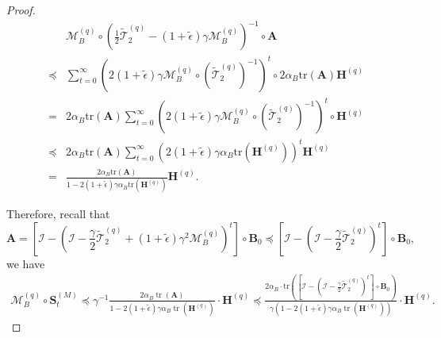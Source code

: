 \documentclass[11pt, letterpaper]{article}
\begin{document}
\begin{proof}
    \begin{equation*}
        \begin{aligned}
            &\mathcal{M}_B^{(q)}\circ \left(\frac{1}{2}\widetilde{\mathcal{T}}_2^{(q)}-(1+\widetilde{\epsilon})\gamma\mathcal{M}_B^{(q)}\right)^{-1}\circ\mathbf{A}\\
            \preceq&\sum_{t=0}^\infty \left(2(1+\widetilde{\epsilon})\gamma\mathcal{M}_B^{(q)}\circ(\widetilde{\mathcal{T}}_2^{(q)})^{-1}\right)^t\circ 2\alpha_B\mathrm{tr}(\mathbf{A})\mathbf{H}^{(q)}\\
            =&2\alpha_B\mathrm{tr}(\mathbf{A})\sum_{t=0}^\infty \left(2(1+\widetilde{\epsilon})\gamma\mathcal{M}_B^{(q)}\circ(\widetilde{\mathcal{T}}_2^{(q)})^{-1}\right)^{t}\circ \mathbf{H}^{(q)}\\
            \preceq&2\alpha_B\mathrm{tr}(\mathbf{A})\sum_{t=0}^\infty \left(2(1+\widetilde{\epsilon})\gamma\alpha_B\mathrm{tr}(\mathbf{H}^{(q)})\right)^{t} \mathbf{H}^{(q)}\\
            =&\frac{2\alpha_B\mathrm{tr}(\mathbf{A})}{1-2(1+\widetilde{\epsilon})\gamma\alpha_B\mathrm{tr}(\mathbf{H}^{(q)})}\mathbf{H}^{(q)}.
        \end{aligned}
    \end{equation*}

    Therefore, recall that
    \begin{equation*}
        \mathbf{A}=\left[\mathcal{I}-\left(\mathcal{I}-\frac{\gamma}{2}\widetilde{\mathcal{T}}_2^{(q)}+(1+\widetilde{\epsilon})\gamma^2\mathcal{M}_B^{(q)}\right)^t\right]\circ \mathbf{B}_0\preceq\left[\mathcal{I}-\left(\mathcal{I}-\frac{\gamma}{2}\widetilde{\mathcal{T}}_2^{(q)}\right)^t\right]\circ \mathbf{B}_0,
    \end{equation*}
    we have
    \begin{equation*}
        \begin{aligned}
            \mathcal{M}_B^{(q)} \circ \mathbf{S}_t^{(M)} \preceq \gamma^{-1}\frac{2\alpha_B\operatorname{tr}(\mathbf{A})}{1-2(1+\tilde{\epsilon})\gamma\alpha_B\operatorname{tr}(\mathbf{H}^{(q)})}\cdot\mathbf{H}^{(q)}\preceq \frac{2\alpha_B\cdot\mathrm{tr}\left(\left[\mathcal{I}-(\mathcal{I}-\frac{\gamma}{2}\widetilde{\mathcal{T}}_2^{(q)})^t\right]\circ\mathbf{B}_0\right)}{\gamma(1-2(1+\tilde{\epsilon})\gamma\alpha_B\operatorname{tr}(\mathbf{H}^{(q)}))}\cdot\mathbf{H}^{(q)}.
        \end{aligned}
    \end{equation*}
\end{proof}
\end{document}
